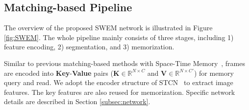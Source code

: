 \subsection{Matching-based Pipeline}
\label{subsec:pipeline}
The overview of the proposed SWEM network is illustrated in Figure \ref{fig:SWEM}. The whole pipeline mainly consists of three stages, including 1) feature encoding, 2) segmentation, and 3) memorization. 

Similar to previous matching-based methods with Space-Time Memory~\cite{Oh_2019_ICCV,seong_2020_ECCV,li_2020_ECCV_GCM,liang2020video, hu2021learning,xie2021efficient,wang2021swiftnet,seong2021hierarchical,cheng2021stcn}, frames are encoded into \textbf{Key}-\textbf{Value} pairs ($\mathbf{K}\in \mathbb{R}^{N\times C}$ and $\mathbf{V} \in \mathbb{R}^{N\times C'}$) for memory query and read. We adopt the encoder structure of STCN~\cite{cheng2021stcn} to extract image features. The key features are also reused for memorization. Specific network details are described in Section \ref{subsec:network}.

